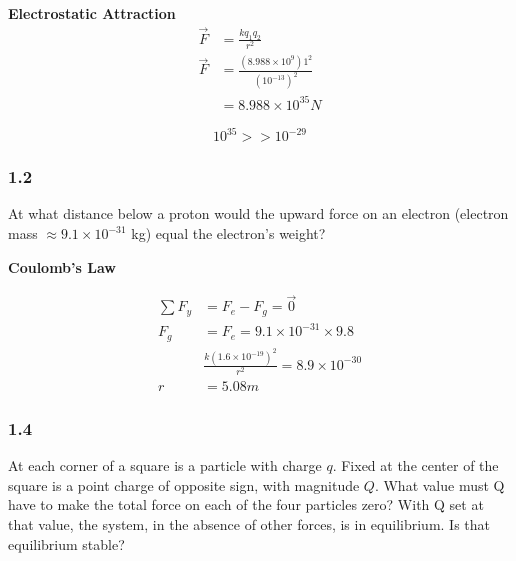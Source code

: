 \documentclass[svgnames]{article}
\begin{document}
 \vspace{10px} 
 
 \textbf{Electrostatic Attraction} 
 \begin{align*} 
 \vec{F} &= \frac{kq_1q_2}{r^2} \\
 \vec{F} &= \frac{(8.988 \times 10^{9})1^2}{(10^{-13})^2} \\
 & = 8.988 \times 10^{35} N
 \end{align*}
 
\vspace{10px} 

\[ 10^{35} >> 10^{-29} \]

\subsubsection{1.2}

At what distance below a proton would the upward force on an electron (electron
mass $\approx 9.1 \times 10^{-31}$ kg) equal the electron's weight?
\vspace{20px}


\textbf{Coulomb's Law} 

\begin{align*}
  \sum F_y &= F_e - F_g = \vec{0}\\
  F_g &= F_e = 9.1 \times 10^{-31} \times 9.8 \\
  &\frac{k(1.6\times 10^{-19})^2}{r^2} = 8.9 \times 10^{-30} \\
  r &= 5.08m 
\end{align*}

\subsubsection{1.4}

At each corner of a square is a particle with charge $q$. Fixed at the center
of the square is a point charge of opposite sign, with magnitude $Q$. What
value must Q have to make the total force on each of the four particles zero?
With Q set at that value, the system, in the absence of other forces, is in
equilibrium. Is that equilibrium stable? 
\end{document}
